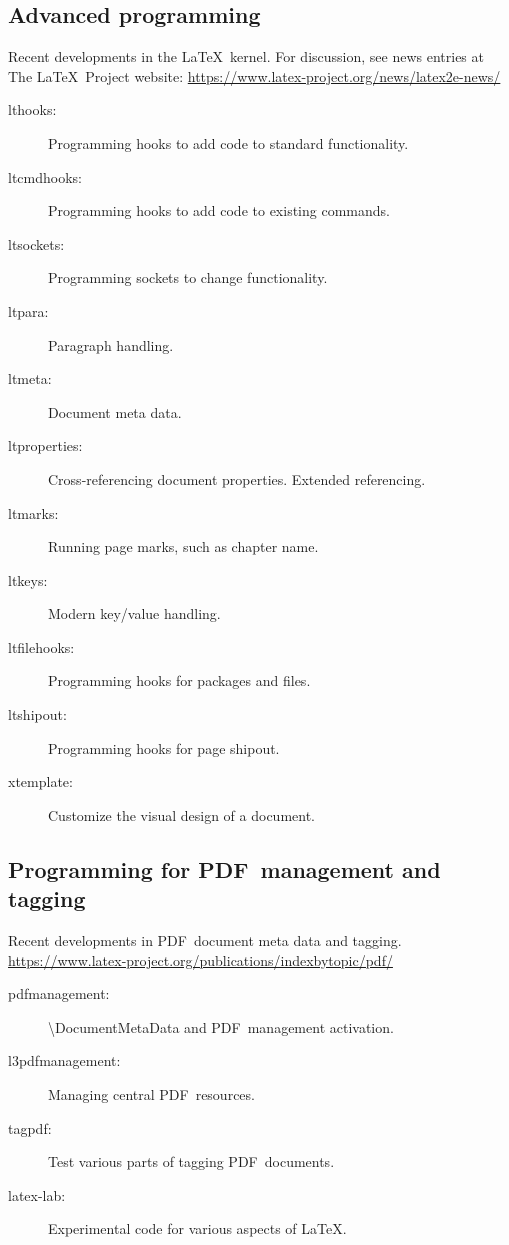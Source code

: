\documentclass{article}
\DeclareRobustCommand{\cs}[1]{{\tt \char`\\#1}}
\def\PDF{\acro{PDF}}
\newcommand{\acro}[1]{\textsc{\MakeLowercase{#1}}}
\def\\{ }%
\def\pkg#1{#1}%
\def\cs#1{\textbackslash#1}%
\def\LaTeX{LaTeX}%
\def\acro#1{#1}%
\def\PDF{PDF}%
\renewcommand*{\pkg}[1]{#1}
\renewcommand*{\LaTeX}{LaTeX}
\begin{document}
\printbibliography[
    heading=none,
    category=programminglatex,
]


\subsection{Advanced programming}

Recent developments in the \LaTeX\ kernel.
For discussion, see news entries at The \LaTeX\ Project website:
\url{https://www.latex-project.org/news/latex2e-news/}

\begin{multicols}{2}
\begin{description}
\item[\pkg{lthooks}:] Programming hooks to add code to standard functionality.
\item[\pkg{ltcmdhooks}:] Programming hooks to add code to existing commands.
\item[\pkg{ltsockets}:] Programming sockets to change functionality.
\item[\pkg{ltpara}:] Paragraph handling.
\item[\pkg{ltmeta}:] Document meta data.
\item[\pkg{ltproperties}:] Cross-referencing document properties.  Extended referencing.
\item[\pkg{ltmarks}:] Running page marks, such as chapter name.
\item[\pkg{ltkeys}:] Modern key/value handling.  
\item[\pkg{ltfilehooks}:] Programming hooks for packages and files.
\item[\pkg{ltshipout}:] Programming hooks for page shipout.
\item[\pkg{xtemplate}:] Customize the visual design of a document.
\end{description}
\end{multicols}


\subsection{Programming for \PDF\ management and tagging}

Recent developments in \PDF\ document meta data and tagging. \\
\url{https://www.latex-project.org/publications/indexbytopic/pdf/}

\begin{multicols}{2}
\begin{description}
\item[\pkg{pdfmanagement}:] \cs{DocumentMetaData} and \PDF\ management activation.
\item[\pkg{l3pdfmanagement}:] Managing central \PDF\ resources.
\item[\pkg{tagpdf}:] Test various parts of tagging \PDF\ documents.
\item[\pkg{latex-lab}:] Experimental code for various aspects of \LaTeX.
\end{description}
\end{multicols}
\end{document}
